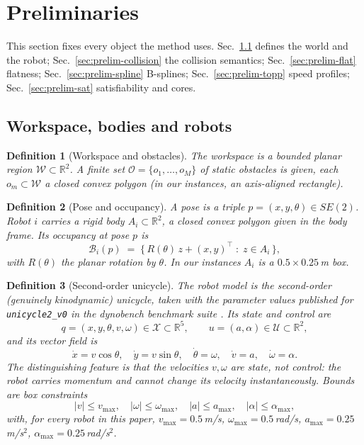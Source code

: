 \documentclass[conference]{IEEEtran}
\newtheorem{definition}{Definition}
\newcommand{\R}{\mathbb{R}}
\newcommand{\W}{\mathcal{W}}
\newcommand{\Obs}{\mathcal{O}}
\newcommand{\Bod}{\mathcal{B}}
\newcommand{\X}{\mathcal{X}}
\newcommand{\Uc}{\mathcal{U}}
\begin{document}
\section{Preliminaries}
\label{sec:prelim}

This section fixes every object the method uses. Sec.~\ref{sec:prelim-world} defines the
world and the robot; Sec.~\ref{sec:prelim-collision} the collision semantics;
Sec.~\ref{sec:prelim-flat} flatness; Sec.~\ref{sec:prelim-spline} B-splines;
Sec.~\ref{sec:prelim-topp} speed profiles; Sec.~\ref{sec:prelim-sat} satisfiability and
cores.

\subsection{Workspace, bodies and robots}
\label{sec:prelim-world}

\begin{definition}[Workspace and obstacles]
The workspace is a bounded planar region $\W \subset \R^2$. A finite set
$\Obs = \{o_1,\dots,o_M\}$ of static obstacles is given, each $o_m \subset \W$ a closed
convex polygon (in our instances, an axis-aligned rectangle).
\end{definition}

\begin{definition}[Pose and occupancy]
A \emph{pose} is a triple $p = (x,y,\theta) \in SE(2)$. Robot $i$ carries a rigid body
$A_i \subset \R^2$, a closed convex polygon given in the body frame. Its \emph{occupancy}
at pose $p$ is
\[
  \Bod_i(p) \;=\; \{\, R(\theta)\,z + (x,y)^{\!\top} \;:\; z \in A_i \,\},
\]
with $R(\theta)$ the planar rotation by $\theta$. In our instances $A_i$ is a
$0.5 \times 0.25$\,m box.
\end{definition}

\begin{definition}[Second-order unicycle]
\label{def:robot}
The robot model is the second-order (genuinely kinodynamic) unicycle, taken with the
parameter values published for \texttt{unicycle2\_v0} in the dynobench benchmark suite
\cite{dynobench}. Its state and control are
\[
  q = (x,y,\theta,v,\omega) \in \X \subset \R^5,
  \qquad
  u = (a,\alpha) \in \Uc \subset \R^2 ,
\]
and its vector field is
\begin{equation}
  \dot x = v\cos\theta,\quad
  \dot y = v\sin\theta,\quad
  \dot\theta = \omega,\quad
  \dot v = a,\quad
  \dot\omega = \alpha .
  \label{eq:dyn}
\end{equation}
The distinguishing feature is that the velocities $v,\omega$ are \emph{state}, not control:
the robot carries momentum and cannot change its velocity instantaneously. Bounds are
box constraints
\begin{equation}
  |v| \le v_{\max},\quad |\omega| \le \omega_{\max},\quad
  |a| \le a_{\max},\quad |\alpha| \le \alpha_{\max},
  \label{eq:bounds}
\end{equation}
with, for every robot in this paper,
$v_{\max}=0.5$\,m/s, $\omega_{\max}=0.5$\,rad/s,
$a_{\max}=0.25$\,m/s$^2$, $\alpha_{\max}=0.25$\,rad/s$^2$.
\end{definition}
\end{document}
